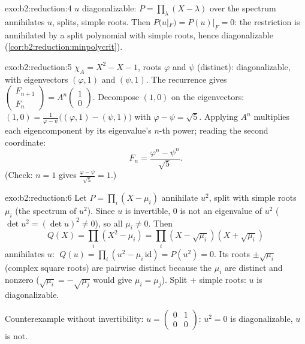 \begin{solution}{exo:b2:reduction:4}
$u$ diagonalizable: $P = \prod_{\lambda}(X - \lambda)$ over the
spectrum annihilates $u$, splits, simple roots. Then $P(u|_F) =
P(u)|_F = 0$: the restriction is annihilated by a split polynomial
with simple roots, hence diagonalizable
(\cref{cor:b2:reduction:minpolycrit}).
\end{solution}

\begin{solution}{exo:b2:reduction:5}
$\chi_A = X^2 - X - 1$, roots $\varphi$ and $\psi$ (distinct):
diagonalizable, with eigenvectors $(\varphi, 1)$ and $(\psi, 1)$.
The recurrence gives $\begin{pmatrix} F_{n+1}\\ F_n \end{pmatrix} =
A^n \begin{pmatrix}1\\ 0\end{pmatrix}$. Decompose $(1, 0)$ on the
eigenvectors: $(1,0) = \frac{1}{\varphi - \psi}\bigl((\varphi, 1) -
(\psi, 1)\bigr)$ with $\varphi - \psi = \sqrt5$. Applying $A^n$
multiplies each eigencomponent by its eigenvalue's $n$-th power;
reading the second coordinate:
\[
F_n = \frac{\varphi^n - \psi^n}{\sqrt 5} .
\]
(Check: $n = 1$ gives $\frac{\varphi - \psi}{\sqrt5} = 1$.)
\end{solution}

\begin{solution}{exo:b2:reduction:6}
Let $P = \prod_i (X - \mu_i)$ annihilate $u^2$, split with simple
roots $\mu_i$ (the spectrum of $u^2$). Since $u$ is invertible, $0$
is not an eigenvalue of $u^2$ ($\det u^2 = (\det u)^2 \neq 0$), so
all $\mu_i \neq 0$. Then
\[
Q(X) = \prod_i (X^2 - \mu_i) = \prod_i (X - \sqrt{\mu_i})(X +
\sqrt{\mu_i})
\]
annihilates $u$: $\;Q(u) = \prod_i (u^2 - \mu_i\,\mathrm{id}) =
P(u^2) = 0$. Its roots $\pm
\sqrt{\mu_i}$ (complex square roots) are pairwise distinct because
the $\mu_i$ are distinct and nonzero ($\sqrt{\mu_i} = -\sqrt{\mu_j}$
would give $\mu_i = \mu_j$). Split + simple roots: $u$ is
diagonalizable.

Counterexample without invertibility: $u = \begin{pmatrix} 0 & 1\\
0 & 0\end{pmatrix}$: $u^2 = 0$ is diagonalizable, $u$ is not.
\end{solution}

